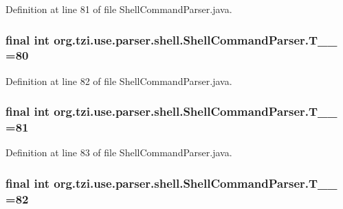 Definition at line 81 of file Shell\-Command\-Parser.\-java.

\hypertarget{classorg_1_1tzi_1_1use_1_1parser_1_1shell_1_1_shell_command_parser_aeb01bf07b9611b48ada7537cbe98cba1}{
\subsubsection[{T\-\_\-\-\_\-80}]{\setlength{\rightskip}{0pt plus 5cm}final int org.\-tzi.\-use.\-parser.\-shell.\-Shell\-Command\-Parser.\-T\-\_\-\-\_ =80\hspace{0.3cm}{\ttfamily [static]}}}\label{classorg_1_1tzi_1_1use_1_1parser_1_1shell_1_1_shell_command_parser_aeb01bf07b9611b48ada7537cbe98cba1}


Definition at line 82 of file Shell\-Command\-Parser.\-java.

\hypertarget{classorg_1_1tzi_1_1use_1_1parser_1_1shell_1_1_shell_command_parser_a403e371c7ab863934f2d3d8f58ff2344}{
\subsubsection[{T\-\_\-\-\_\-81}]{\setlength{\rightskip}{0pt plus 5cm}final int org.\-tzi.\-use.\-parser.\-shell.\-Shell\-Command\-Parser.\-T\-\_\-\-\_ =81\hspace{0.3cm}{\ttfamily [static]}}}\label{classorg_1_1tzi_1_1use_1_1parser_1_1shell_1_1_shell_command_parser_a403e371c7ab863934f2d3d8f58ff2344}


Definition at line 83 of file Shell\-Command\-Parser.\-java.

\hypertarget{classorg_1_1tzi_1_1use_1_1parser_1_1shell_1_1_shell_command_parser_a33aa115b16a30748e5aa0185c4aa78df}{
\subsubsection[{T\-\_\-\-\_\-82}]{\setlength{\rightskip}{0pt plus 5cm}final int org.\-tzi.\-use.\-parser.\-shell.\-Shell\-Command\-Parser.\-T\-\_\-\-\_ =82\hspace{0.3cm}{\ttfamily [static]}}}\label{classorg_1_1tzi_1_1use_1_1parser_1_1shell_1_1_shell_command_parser_a33aa115b16a30748e5aa0185c4aa78df}



